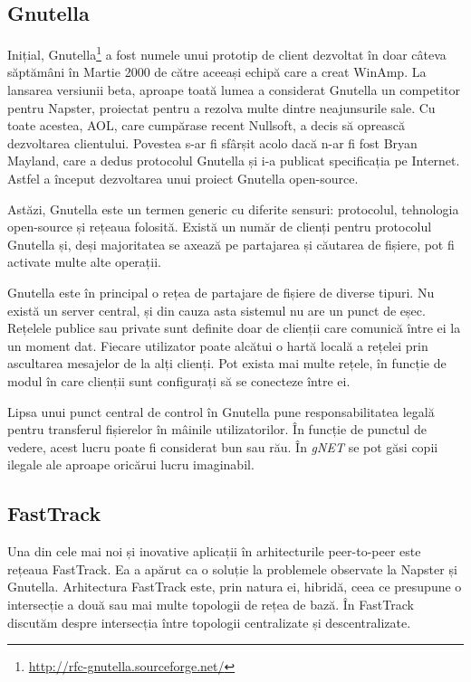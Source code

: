 \subsection{Gnutella}

Inițial, Gnutella\footnote{\url{http://rfc-gnutella.sourceforge.net/}}
a fost numele unui prototip de client dezvoltat în doar câteva săptămâni
în Martie 2000 de către aceeași echipă care a creat WinAmp. La lansarea
versiunii beta, aproape toată lumea a considerat Gnutella un competitor
pentru Napster, proiectat pentru a rezolva multe dintre neajunsurile sale.
Cu toate acestea, AOL, care cumpărase recent Nullsoft, a decis să oprească
dezvoltarea clientului. Povestea s-ar fi sfârșit acolo dacă n-ar fi fost
Bryan Mayland, care a dedus protocolul Gnutella și i-a publicat specificația
pe Internet. Astfel a început dezvoltarea unui proiect Gnutella open-source.

Astăzi, Gnutella este un termen generic cu diferite sensuri: protocolul,
tehnologia open-source și rețeaua folosită. Există un număr de clienți pentru
protocolul Gnutella și, deși majoritatea se axează pe partajarea și
căutarea de fișiere, pot fi activate multe alte operații.

Gnutella este în principal o rețea de partajare de fișiere de
diverse tipuri. Nu există un server central, și din cauza asta sistemul
nu are un punct de eșec. Rețelele publice sau private sunt definite doar
de clienții care comunică între ei la un moment dat. Fiecare utilizator
poate alcătui o hartă locală a rețelei prin ascultarea mesajelor de la
alți clienți. Pot exista mai multe rețele, în funcție de modul în care
clienții sunt configurați să se conecteze între ei.

Lipsa unui punct central de control în Gnutella pune responsabilitatea 
legală pentru transferul fișierelor în mâinile utilizatorilor. În funcție
de punctul de vedere, acest lucru poate fi considerat bun sau rău. În
\textit{gNET} se pot găsi copii ilegale ale aproape oricărui lucru imaginabil.

\subsection{FastTrack}

Una din cele mai noi și inovative aplicații în arhitecturile peer-to-peer
este rețeaua FastTrack. Ea a apărut ca o soluție la problemele observate la
Napster și Gnutella. Arhitectura FastTrack este, prin natura ei, hibridă,
 ceea ce presupune o intersecție a două sau mai multe topologii de rețea
 de bază. În FastTrack discutăm despre intersecția între topologii centralizate
 și descentralizate.

